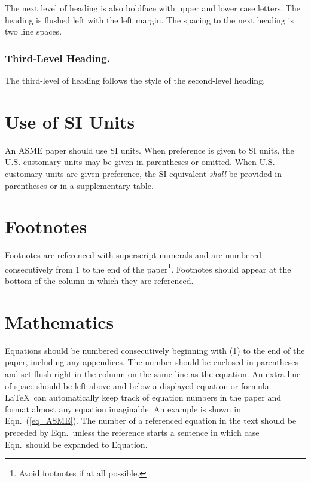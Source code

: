 \documentclass[twocolumn,10pt,journal]{asme2e}
\begin{document}
The next level of heading is also boldface with upper and lower case letters.
The heading is flushed left with the left margin.
The spacing to the next heading is two line spaces.

\subsubsection{Third-Level Heading.}

The third-level of heading follows the style of the second-level heading.


\section{Use of SI Units}

An ASME paper should use SI units.
When preference is given to SI units, the U.S. customary units may be given in parentheses or omitted.
When U.S. customary units are given preference, the SI equivalent {\em shall} be provided in parentheses or in a supplementary table.

\section{Footnotes\protect\footnotemark}

Footnotes are referenced with superscript numerals and are numbered consecutively from 1 to the end of the paper\footnote{Avoid footnotes if at all possible.}.
Footnotes should appear at the bottom of the column in which they are referenced.


\section{Mathematics}

Equations should be numbered consecutively beginning with (1) to the end of the paper, including any appendices.
The number should be enclosed in parentheses and set flush right in the column on the same line as the equation.
An extra line of space should be left above and below a displayed equation or formula.
\LaTeX\ can automatically keep track of equation numbers in the paper and format almost any equation imaginable.
An example is shown in Eqn.~(\ref{eq_ASME}).
The number of a referenced equation in the text should be preceded by Eqn.\ unless the reference starts a sentence in which case Eqn.\ should be expanded to Equation.
\end{document}
